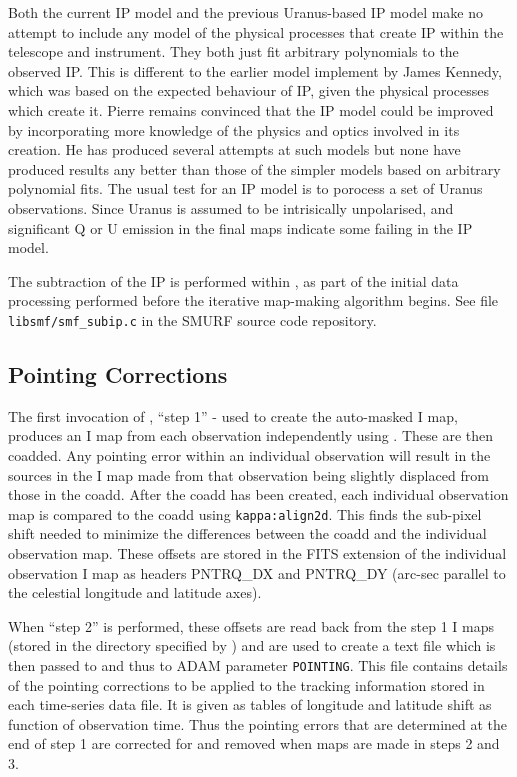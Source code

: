 \documentclass[twoside,11pt]{starlink}
\begin{document}
Both the current IP model and the previous Uranus-based IP model
make no attempt to include any model of the physical processes that
create IP within the telescope and instrument. They both just fit
arbitrary polynomials to the observed IP. This is different to the
earlier model implement by James Kennedy, which was based on the expected
behaviour of IP, given the physical processes which create it. Pierre
remains convinced that the IP model could be improved by incorporating
more knowledge of the physics and optics involved in its creation.  He
has produced several attempts at such models but none have produced
results any better than those of the simpler models based on arbitrary
polynomial fits. The usual test for an IP model is to porocess a set of
Uranus observations. Since Uranus is assumed to be intrisically
unpolarised, and significant Q or U emission in the final maps indicate
some failing in the IP model.

The subtraction of the IP is performed within \mmap, as part of the
initial data processing performed before the iterative map-making
algorithm begins. See file \texttt{libsmf/smf\_subip.c} in the SMURF
source code repository.

\subsection{Pointing Corrections}
The first invocation of \ptmap, ``step 1'' - used to create the
auto-masked I map, produces an I map from each observation independently
using \mmap. These are then coadded. Any pointing error within an
individual observation will result in the sources in the I map made from
that observation being slightly displaced from those in the coadd. After
the coadd has been created, each individual observation map is compared
to the coadd using \texttt{kappa:align2d}. This finds the sub-pixel shift
needed to minimize the differences between the coadd and the individual
observation map. These offsets are stored in the FITS extension of the
individual observation I map as headers PNTRQ\_DX and PNTRQ\_DY (arc-sec
parallel to the celestial longitude and latitude axes).

When ``step 2'' is performed, these offsets are read back from the step 1
I maps (stored in the directory specified by ) and are used to
create a text file which is then passed to \sloop and thus to \mmap
ADAM parameter \texttt{POINTING}. This file contains details of the
pointing corrections to be applied to the tracking information stored in
each time-series data file. It is given as tables of longitude and
latitude shift as function of observation time. Thus the pointing errors
that are determined at the end of step 1 are corrected for and
removed when maps are made in steps 2 and 3.
\end{document}
